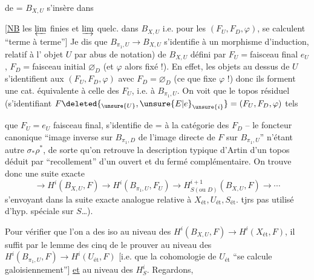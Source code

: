 de = $B_{X,U}$ s'insère dans

[\uline{NB} les $\varprojlim$ finies et $\varinjlim$ quelc.
dans $B_{X,U}$ i.e. pour les $(F_U,F_D,\varphi)$, se
calculent ``terme à terme''] Je dis
que $B_{\pi_1,U}\longrightarrow B_{X,U}$ s'identifie à un
morphisme d'induction, relatif à l'
objet   $U$ par abus de notation)
de $B_{X,U}$ défini par
$F_U={}$faisceau final $e_U$, $F_D={}$faisceau initial $\varnothing_D$
(et $\varphi$  alors fixé !). En effet, les
objets  au dessus de $U$ s'identifient aux
$(F_U,F_D,\varphi)$ avec $F_D=\varnothing_D$ (ce que fixe $\varphi$ !) donc
ils forment une cat. équivalente à celle des
$F_U$, i.e. à $B_{\pi_1,U}$. On voit que le topos
résiduel (s'identifiant   $F\deleted{_{\unsure{U}},\unsure{E|e}_{\unsure{i}}}=(F_U,F_D,\varphi)$ tels

que $F_U=e_U$ faisceau final, s'identifie de = à la
catégorie  des $F_D$  -- le foncteur
canonique ``image inverse sur $B_{\pi_1,D}$ de l'image
directe de $F$ sur $B_{\pi_1,U}$'' n'étant autre
$\sigma_*\rho^*$, de sorte qu'on retrouve la description
 typique d'Artin d'un topos déduit
par ``recollement'' d'un  ouvert et du
fermé complémentaire.
On trouve donc une suite exacte
\[
\longrightarrow H^i(B_{X,U},F)\longrightarrow
H^i(B_{\pi_1,U},F_U)\longrightarrow
H^{i+1}_{S(\text{ou }D)}(B_{X,U},F)\longrightarrow\cdots
\]
s'envoyant dans la suite exacte analogue
relative à $X_{\mathrm{ét}},U_{\mathrm{ét}},S_{\mathrm{ét}}$.  
tjrs pas utilisé d'hyp. spéciale sur $S$\ldots).

Pour vérifier que l'on a des iso
au niveau des $H^i(B_{X,U},F)\longrightarrow H^i(X_{\mathrm{ét}},F)$,
il suffit par le lemme des cinq de
le prouver au niveau des
$H^i(B_{\pi_1,U},F)\longrightarrow H^i(U_{\mathrm{ét}},F)$ [i.e.  que la
cohomologie de $U_{\mathrm{ét}}$ ``se calcule galoisiennement'']
\uline{et} au niveau des $H^i_S$.  Regardons,

